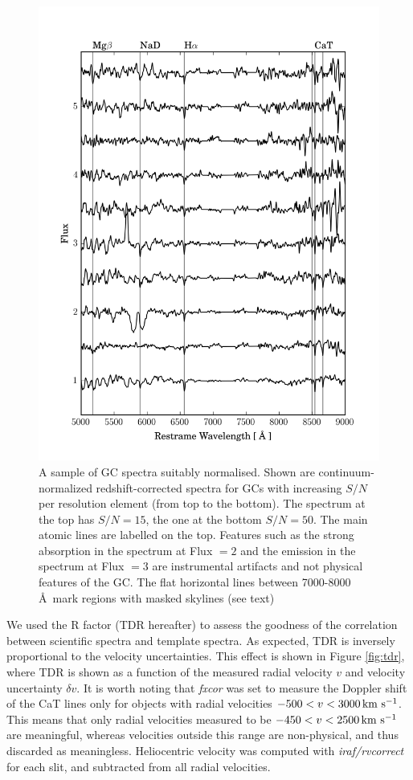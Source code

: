 \documentclass[useAMS,usenatbib]{mn2e}
\newcommand{\kms}{\mbox{\,km~s$^{-1}$}}
\begin{document}
\begin{figure}
\centering
\includegraphics[width=\columnwidth]{figures/vstack_spectra.png} 
\caption{A sample of GC spectra suitably normalised. Shown are 
continuum-normalized redshift-corrected spectra for GCs with increasing 
$S/N$ per resolution element (from top to the bottom). The spectrum at the top has $S/N = 15$, 
the one at the bottom $S/N = 50$. The main atomic lines are labelled on the top. Features 
such as the strong absorption in the spectrum at Flux $= 2$ and the emission in 
the spectrum at Flux $=3$ are instrumental artifacts and not physical features 
of the GC. The flat horizontal lines between 7000-8000 \AA\ mark regions with 
masked skylines (see text)}
\label{fig:spectra}
\end{figure}

We used the \citet{Tonry79} R factor (TDR hereafter) to assess the goodness of 
the correlation between scientific spectra and template spectra. As expected, 
TDR is inversely proportional to the velocity uncertainties. This effect is 
shown in Figure \ref{fig:tdr}, where TDR is shown as a function of the measured 
radial velocity $v$ and velocity uncertainty $\delta v$. 
It is worth noting that {\it fxcor} was set to measure the Doppler shift of the 
CaT lines only for objects with radial velocities $-500 < v < 3000 \kms$. This 
means that only radial velocities measured to be $-450 < v < 2500 \kms$ are 
meaningful, whereas velocities outside this range are non-physical, and thus 
discarded as meaningless. Heliocentric velocity was computed with {\it iraf/rvcorrect} 
for each slit, and subtracted from all radial velocities. 
\end{document}
